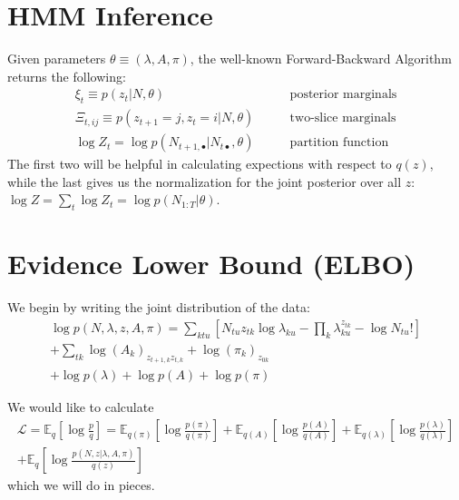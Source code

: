 \documentclass[11pt]{article}
\begin{document}
\section{HMM Inference}
Given parameters $\theta \equiv (\lambda, A, \pi)$, the well-known Forward-Backward Algorithm returns the following:
\begin{align}
    \xi_{t} \equiv p(z_{t}|N, \theta) \qquad &\text{posterior marginals}\\
    \Xi_{t, ij} \equiv p(z_{t+1} = j, z_{t} = i|N, \theta) \qquad &\text{two-slice marginals}\\
    \log Z_{t} = \log p(N_{t+1, \bullet}|N_{t\bullet}, \theta) \qquad &\text{partition function}
\end{align}
The first two will be helpful in calculating expections with respect to $q(z)$, while the last gives us the normalization for the joint posterior over all $z$: $\log Z = \sum_t \log Z_{t} = \log p(N_{1:T}|\theta)$. 

\section{Evidence Lower Bound (ELBO)}
We begin by writing the joint distribution of the data:
\begin{multline}
    \log p(N, \lambda, z, A,\pi) = \sum_{ktu}\left[ N_{tu} z_{tk} \log \lambda_{ku} - \prod_k \lambda_{ku}^{z_{tk}} - \log N_{tu}!\right] \\
    + \sum_{tk} \log (A_k)_{z_{t+1, k} z_{t, k}} + \log (\pi_k)_{z_{0k}} \\
    + \log p(\lambda) + \log p(A) + \log p(\pi) 
\end{multline}

We would like to calculate 
\begin{multline}
    \mathcal{L} = \mathbb{E}_q\left[\log \frac{p}{q}\right] = \mathbb{E}_{q(\pi)} \left[\log \frac{p(\pi)}{q(\pi)} \right] + \mathbb{E}_{q(A)} \left[\log \frac{p(A)}{q(A)} \right] + \mathbb{E}_{q(\lambda)} \left[\log \frac{p(\lambda)}{q(\lambda)} \right] \\ + \mathbb{E}_{q}\left[ \log \frac{p(N, z|\lambda, A, \pi)}{q(z)}\right] 
\end{multline}
which we will do in pieces. 
\end{document}
